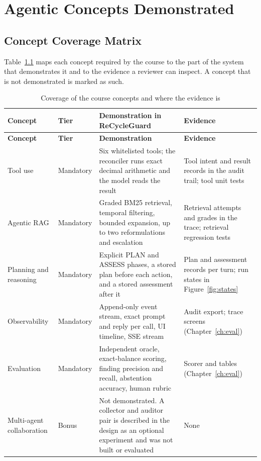 \chapter{Agentic Concepts Demonstrated}
\label{ch:concepts}

\section{Concept Coverage Matrix}
Table~\ref{tab:concepts} maps each concept required by the course to the part of the system that
demonstrates it and to the evidence a reviewer can inspect. A concept that is not demonstrated is marked as such.

{\small
\begin{longtable}{@{}p{2.9cm} p{1.9cm} p{4.9cm} p{4.2cm}@{}}
\caption{Coverage of the course concepts and where the evidence is}\label{tab:concepts}\\
\toprule
\textbf{Concept} & \textbf{Tier} & \textbf{Demonstration in ReCycleGuard} & \textbf{Evidence} \\ \midrule
\endfirsthead
\toprule
\textbf{Concept} & \textbf{Tier} & \textbf{Demonstration} & \textbf{Evidence} \\ \midrule
\endhead
Tool use & Mandatory & Six whitelisted tools; the reconciler runs exact decimal arithmetic and the model reads the result & Tool intent and result records in the audit trail; tool unit tests \\
Agentic RAG & Mandatory & Graded BM25 retrieval, temporal filtering, bounded expansion, up to two reformulations and escalation & Retrieval attempts and grades in the trace; retrieval regression tests \\
Planning and reasoning & Mandatory & Explicit PLAN and ASSESS phases, a stored plan before each action, and a stored assessment after it & Plan and assessment records per turn; run states in Figure~\ref{fig:states} \\
Observability & Mandatory & Append-only event stream, exact prompt and reply per call, UI timeline, SSE stream & Audit export; trace screens (Chapter~\ref{ch:eval}) \\
Evaluation & Mandatory & Independent oracle, exact-balance scoring, finding precision and recall, abstention accuracy, human rubric & Scorer and tables (Chapter~\ref{ch:eval}) \\
Multi-agent collaboration & Bonus & Not demonstrated. A collector and auditor pair is described in the design as an optional experiment and was not built or evaluated & None \\

\end{longtable}}
